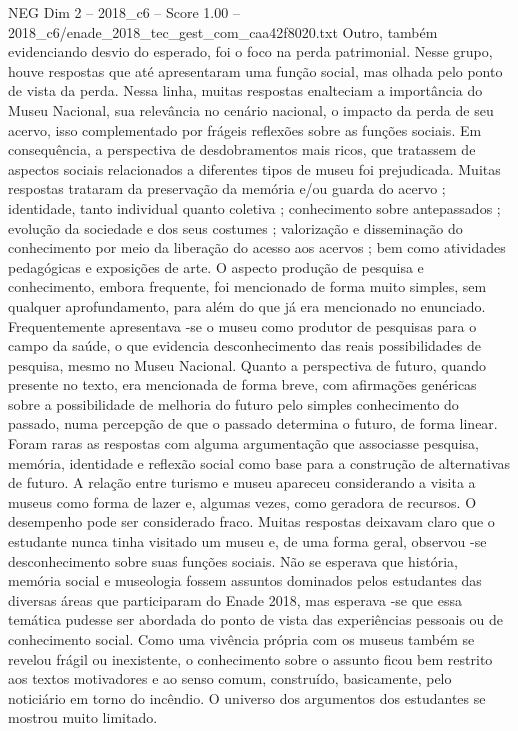 \begin{textsample}{NEG Dim 2 – 2018\_c6 – Score 1.00 – 2018\_c6/enade\_2018\_tec\_gest\_com\_caa42f8020.txt}
Outro, também evidenciando desvio do esperado, foi o foco na perda patrimonial.
Nesse grupo, houve respostas que até apresentaram uma função social, mas olhada pelo ponto de vista da perda.
Nessa linha, muitas respostas enalteciam a importância do Museu Nacional, sua relevância no cenário nacional, o impacto da perda de seu acervo, isso complementado por frágeis reflexões sobre as funções sociais.
Em consequência, a perspectiva de desdobramentos mais ricos, que tratassem de aspectos sociais relacionados a diferentes tipos de museu foi prejudicada.
Muitas respostas trataram da preservação da memória e/ou guarda do acervo ; identidade, tanto individual quanto coletiva ; conhecimento sobre antepassados ; evolução da sociedade e dos seus costumes ; valorização e disseminação do conhecimento por meio da liberação do acesso aos acervos ; bem como atividades pedagógicas e exposições de arte.
O aspecto produção de pesquisa e conhecimento, embora frequente, foi mencionado de forma muito simples, sem qualquer aprofundamento, para além do que já era mencionado no enunciado.
Frequentemente apresentava -se o museu como produtor de pesquisas para o campo da saúde, o que evidencia desconhecimento das reais possibilidades de pesquisa, mesmo no Museu Nacional.
Quanto a perspectiva de futuro, quando presente no texto, era mencionada de forma breve, com afirmações genéricas sobre a possibilidade de melhoria do futuro pelo simples conhecimento do passado, numa percepção de que o passado determina o futuro, de forma linear.
Foram raras as respostas com alguma argumentação que associasse pesquisa, memória, identidade e reflexão social como base para a construção de alternativas de futuro.
A relação entre turismo e museu apareceu considerando a visita a museus como forma de lazer e, algumas vezes, como geradora de recursos.
O desempenho pode ser considerado fraco.
Muitas respostas deixavam claro que o estudante nunca tinha visitado um museu e, de uma forma geral, observou -se desconhecimento sobre suas funções sociais.
Não se esperava que história, memória social e museologia fossem assuntos dominados pelos estudantes das diversas áreas que participaram do Enade 2018, mas esperava -se que essa temática pudesse ser abordada do ponto de vista das experiências pessoais ou de conhecimento social.
Como uma vivência própria com os museus também se revelou frágil ou inexistente, o conhecimento sobre o assunto ficou bem restrito aos textos motivadores e ao senso comum, construído, basicamente, pelo noticiário em torno do incêndio.
O universo dos argumentos dos estudantes se mostrou muito limitado.

\end{textsample}
